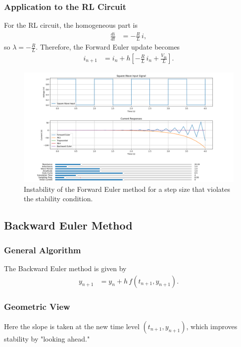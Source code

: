 \documentclass[12pt]{article}
\begin{document}
\subsubsection*{Application to the RL Circuit}
For the RL circuit, the homogeneous part is 
\begin{align}
\frac{di}{dt} &= -\frac{R}{L}\, i,
\end{align}
so $\lambda = -\frac{R}{L}$. Therefore, the Forward Euler update becomes 
\begin{align}
i_{n+1} &= i_n + h\left[-\frac{R}{L}\, i_n+\frac{V_{\text{in}}}{L}\right].
\end{align}

\begin{figure}[htbp]
  \centering
  \includegraphics[width=\textwidth]{figs/instability_fwd_euler.png}
  \caption{Instability of the Forward Euler method for a step size that violates the stability condition.}
  \label{fig:instability_forward_euler}
\end{figure}

\subsection{Backward Euler Method}

\subsubsection*{General Algorithm}
The Backward Euler method is given by
\begin{align}
y_{n+1} &= y_n + h\, f(t_{n+1},y_{n+1}).
\end{align}

\subsubsection*{Geometric View}
Here the slope is taken at the new time level $(t_{n+1},y_{n+1})$, which improves stability by "looking ahead."
\end{document}

